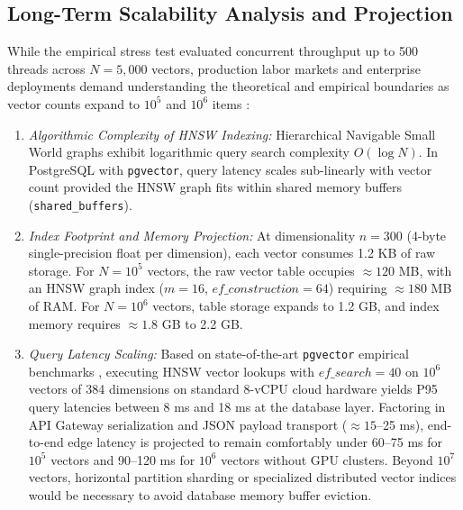 \documentclass[a4paper,fleqn]{cas-dc}
\begin{document}
\subsection{Long-Term Scalability Analysis and Projection}
While the empirical stress test evaluated concurrent throughput up to 500 threads across $N = 5,000$ vectors, production labor markets and enterprise deployments demand understanding the theoretical and empirical boundaries as vector counts expand to $10^5$ and $10^6$ items \cite{alboqmi2025}:
\begin{enumerate}
    \item \textit{Algorithmic Complexity of HNSW Indexing:} Hierarchical Navigable Small World graphs exhibit logarithmic query search complexity $O(\log N)$. In PostgreSQL with \texttt{pgvector}, query latency scales sub-linearly with vector count provided the HNSW graph fits within shared memory buffers (\texttt{shared\_buffers}).
    \item \textit{Index Footprint and Memory Projection:} At dimensionality $n = 300$ (4-byte single-precision float per dimension), each vector consumes 1.2 KB of raw storage. For $N = 10^5$ vectors, the raw vector table occupies $\approx 120$ MB, with an HNSW graph index ($m = 16$, $ef\_construction = 64$) requiring $\approx 180$ MB of RAM. For $N = 10^6$ vectors, table storage expands to 1.2 GB, and index memory requires $\approx 1.8$ GB to 2.2 GB.
    \item \textit{Query Latency Scaling:} Based on state-of-the-art \texttt{pgvector} empirical benchmarks \cite{pgvector2025}, executing HNSW vector lookups with $ef\_search = 40$ on $10^6$ vectors of 384 dimensions on standard 8-vCPU cloud hardware yields P95 query latencies between 8 ms and 18 ms at the database layer. Factoring in API Gateway serialization and JSON payload transport ($\approx 15$--25 ms), end-to-end edge latency is projected to remain comfortably under 60--75 ms for $10^5$ vectors and 90--120 ms for $10^6$ vectors without GPU clusters. Beyond $10^7$ vectors, horizontal partition sharding or specialized distributed vector indices would be necessary to avoid database memory buffer eviction.
\end{enumerate}
\end{document}
